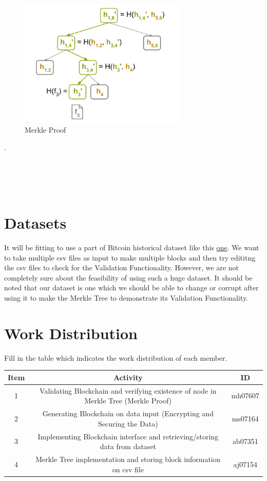 \documentclass{article}
\begin{document}
\begin{figure}[htp]
    \centering
    \includegraphics[width=8cm]{Merkle Proof}
    \caption{Merkle Proof}
    \label{fig:f4}
\end{figure}
.
\\\\\\\\\\
\section{Datasets}
It will be fitting to use a part of Bitcoin historical dataset like this \href{https://www.kaggle.com/datasets/prasoonkottarathil/btcinusd}{ one}. We want to take multiple csv files as input to make multiple blocks and then try edititng the csv files to check for the Validation Functionality. However, we are not completely sure about the feasibility of using such a huge dataset. It should be noted that our dataset is one which we should be able to change or corrupt after using it to make the Merkle Tree to demonstrate its Validation Functionality. 

\newpage
\section{Work Distribution}
Fill in the table which indicates the work distribution of each member.
\begin{center}
  \begin{table}[h]
    \centering
    \begin{tabular}{|c|c|c|}
      \hline
      Item & Activity   & ID      \\ \hline
      
      1    & Validating Blockchain and verifying existence of node in Merkle Tree (Merkle Proof)   & mh07607 \\ \hline
      2    & Generating Blockchain on data input (Encrypting and Securing the Data) & ms07164 \\ \hline
      3    & Implementing Blockchain interface and retrieving/storing data from dataset & ab07351 \\ \hline
      4    & Merkle Tree implementation and storing block information on csv file & aj07154 \\ \hline
    \end{tabular}

    \label{tab:my-table6}
  \end{table}
\end{center}
\end{document}
